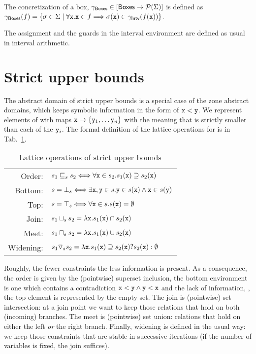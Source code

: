 \documentclass{sig-alternate}
\begin{document}
The concretization of a box, $\gamma_{\mathsf{Boxes}} \in [\mathsf{Boxes} \rightarrow\mathcal{P}{(\Sigma)}]$ is defined as $\gamma_{\mathsf{Boxes}}(f) = \{ \sigma \in \Sigma \mid \forall \mathtt{x}. \mathtt{x} \in f \Longrightarrow \sigma(\mathtt{x}) \in \gamma_{\mathsf{Intv}}(f(\mathtt{x}))\}$.

The assignment and the guards in the interval environment are defined as usual in interval arithmetic.

\section{Strict upper bounds}
The abstract domain of strict upper bounds \SUB{} is a special case of the zone abstract domains, which keeps symbolic information in the form of $\mathtt{x} < \mathtt{y}$.
We represent elements of \SUB{} with maps $\mathtt{x} \mapsto \{ \mathtt{y}_1, \dots \mathtt{y}_n \}$ with the meaning that  is strictly smaller than each of the $\mathtt{y}_i$.
The formal definition of the lattice operations for \SUB{} is in Tab.~\ref{tab:sub}.

\begin{table}[h]
\small
\begin{tabular}{rl}
Order:& $ s_1 \sqsubseteq_s s_2 \Longleftrightarrow \forall \mathtt{x} \in s_2. s_1(\mathtt{x}) \supseteq s_2(\mathtt{x})$ \\
Bottom:& $ s = {\bot}_s \Longleftrightarrow  \exists \mathtt{x,y} \in s. \mathtt{y} \in s(\mathtt{x}) \wedge \mathtt{x} \in s(\mathtt{y})$ \\
Top:& $ s = {\top}_s \Longleftrightarrow \forall \mathtt{x} \in s. s(\mathtt{x}) = \emptyset$\\
Join:& $ s_1 \sqcup_s s_2 = \lambda \mathtt{x}. s_1(\mathtt{x}) \cap s_2(\mathtt{x}) $ \\
Meet:& $ s_1 \sqcap_s s_2 = \lambda \mathtt{x}. s_1(\mathtt{x}) \cup s_2(\mathtt{x}) $  \\
Widening:&  $s_1 \triangledown_s s_2 = \lambda \mathtt{x}. s_1(\mathtt{x}) \supseteq s_2(\mathtt{x}) ? s_2(\mathtt{x}) : \emptyset $
\end{tabular}
\caption{Lattice operations of strict upper bounds}
\label{tab:sub}
\end{table}
Roughly, the fewer constraints the less information is  present.
As a consequence, the order is given by the (pointwise) superset inclusion, the bottom environment is one which contains a contradiction $\mathtt{x} < \mathtt{y} \wedge \mathtt{y} < \mathtt{x}$ and the lack of information, \ie, the top element is represented by the empty set.
The join is (pointwise) set intersection: at a join point we want to keep those relations that hold on both (incoming) branches.
The meet is (pointwise) set union: relations that hold on either the left \emph{or} the right branch.
Finally, widening is defined in the usual way: we keep those
constraints that are stable in successive iterations (if the number of
variables is fixed, the join suffices).
\end{document}
